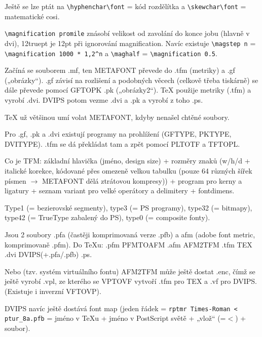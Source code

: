 \documentclass[12pt]{article}					%
\begin{document}
    \begin{poznamka}
        Ještě se lze ptát na \verb|\hyphenchar\font| = kód rozdělítka a \verb|\skewchar\font| = matematické cosi.
    \end{poznamka}

    \begin{poznamka}
        \verb|\magnification promile| znásobí velikost od zavolání do konce jobu (hlavně v dvi), 12truept je 12pt při ignorování magnification. Navíc existuje \verb|\magstep n| = \verb|\magnification 1000 * 1,2^n| a \verb|\maghalf| = \verb|\magnification 0.5|.
    \end{poznamka}

    \begin{definice}[Soubory]
        Začíná se souborem .mf, ten METAFONT převede do .tfm (metriky) a .gf („obrázky“). .gf závisí na rozlišení a podobných věcech (celkově třeba tiskárně) se dále převede pomocí GFTOPK .pk („obrázky2“). TeX použije metriky (.tfm) a vyrobí .dvi. DVIPS potom vezme .dvi a .pk a vyrobí z toho .ps.

        TeX už většinou umí volat METAFONT, kdyby nenašel chtěné soubory.

        Pro .gf, .pk a .dvi existují programy na prohlížení (GFTYPE, PKTYPE, DVITYPE). .tfm se dá překládat tam a zpět pomocí PLTOTF a TFTOPL.

        Co je TFM: základní hlavička (jméno, design size) + rozměry znaků (w/h/d + italické korekce, kódované přes omezeně velkou tabulku (pouze 64 různých šířek písmen $\rightarrow$ METAFONT dělá ztrátovou kompresy)) + program pro kerny a ligatury + seznam variant pro velké operátory a delimitery + fontdimens.
    \end{definice}

    \begin{definice}
        Type1 (= bezierovské segmenty), type3 (= PS programy), type32 (= bitmapy), type42 (= TrueType zabalený do PS), type0 (= composite fonty).

        Jsou 2 soubory .pfa (častěji komprimovaná verze .pfb) a afm (adobe font metric, komprimovaně .pfm). Do TeXu: .pfm PFMTOAFM .afm AFM2TFM .tfm TEX .dvi DVIPS(+.pfa/.pfb) .ps.

        Nebo (tzv. systém virtuálního fontu) AFM2TFM může ještě dostat .enc, čímž se ještě vyrobí .vpl, ze kterého se VPTOVF vytvoří .tfm pro TEX a .vf pro DVIPS. (Existuje i inverzní VFTOVP).

        DVIPS navíc ještě dostává font map (jeden řádek = \verb|rptmr Times-Roman < ptur_8a.pfb| = jméno v TeXu + jméno v PostScript světě + „vlož“ (=$<$) + soubor).
    \end{definice}
\end{document}
